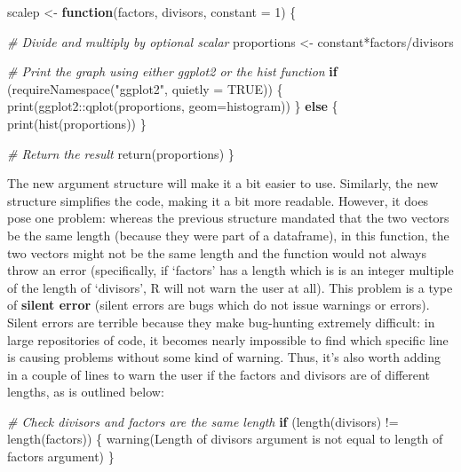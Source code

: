 \documentclass[
]{book}
\newenvironment{Shaded}{\begin{snugshade}}{\end{snugshade}}
\newcommand{\AttributeTok}[1]{\textcolor[rgb]{0.77,0.63,0.00}{#1}}
\newcommand{\CommentTok}[1]{\textcolor[rgb]{0.56,0.35,0.01}{\textit{#1}}}
\newcommand{\ConstantTok}[1]{\textcolor[rgb]{0.00,0.00,0.00}{#1}}
\newcommand{\ControlFlowTok}[1]{\textcolor[rgb]{0.13,0.29,0.53}{\textbf{#1}}}
\newcommand{\DecValTok}[1]{\textcolor[rgb]{0.00,0.00,0.81}{#1}}
\newcommand{\FunctionTok}[1]{\textcolor[rgb]{0.00,0.00,0.00}{#1}}
\newcommand{\NormalTok}[1]{#1}
\newcommand{\OtherTok}[1]{\textcolor[rgb]{0.56,0.35,0.01}{#1}}
\newcommand{\SpecialCharTok}[1]{\textcolor[rgb]{0.00,0.00,0.00}{#1}}
\newcommand{\StringTok}[1]{\textcolor[rgb]{0.31,0.60,0.02}{#1}}
\begin{document}
\begin{Shaded}
\begin{Highlighting}[]
\NormalTok{scalep }\OtherTok{\textless{}{-}} \ControlFlowTok{function}\NormalTok{(factors, divisors, }\AttributeTok{constant =} \DecValTok{1}\NormalTok{) \{}

  \CommentTok{\# Divide and multiply by optional scalar}
\NormalTok{  proportions }\OtherTok{\textless{}{-}}\NormalTok{ constant}\SpecialCharTok{*}\NormalTok{factors}\SpecialCharTok{/}\NormalTok{divisors}

  \CommentTok{\# Print the graph using either ggplot2 or the hist function}
  \ControlFlowTok{if}\NormalTok{ (}\FunctionTok{requireNamespace}\NormalTok{(}\StringTok{"ggplot2"}\NormalTok{, }\AttributeTok{quietly =} \ConstantTok{TRUE}\NormalTok{)) \{}
    \FunctionTok{print}\NormalTok{(ggplot2}\SpecialCharTok{::}\FunctionTok{qplot}\NormalTok{(proportions, }\AttributeTok{geom=}\StringTok{\textquotesingle{}histogram\textquotesingle{}}\NormalTok{))}
\NormalTok{  \} }\ControlFlowTok{else}\NormalTok{ \{}
    \FunctionTok{print}\NormalTok{(}\FunctionTok{hist}\NormalTok{(proportions))}
\NormalTok{  \}}

  \CommentTok{\# Return the result}
  \FunctionTok{return}\NormalTok{(proportions)}
\NormalTok{\}}
\end{Highlighting}
\end{Shaded}

The new argument structure will make it a bit easier to use. Similarly, the new structure simplifies the code, making it a bit more readable. However, it does pose one problem: whereas the previous structure mandated that the two vectors be the same length (because they were part of a dataframe), in this function, the two vectors might not be the same length and the function would not always throw an error (specifically, if `factors' has a length which is is an integer multiple of the length of `divisors', R will not warn the user at all). This problem is a type of \textbf{silent error} (silent errors are bugs which do not issue warnings or errors). Silent errors are terrible because they make bug-hunting extremely difficult: in large repositories of code, it becomes nearly impossible to find which specific line is causing problems without some kind of warning. Thus, it's also worth adding in a couple of lines to warn the user if the factors and divisors are of different lengths, as is outlined below:

\begin{Shaded}
\begin{Highlighting}[]
  \CommentTok{\# Check divisors and factors are the same length}
  \ControlFlowTok{if}\NormalTok{ (}\FunctionTok{length}\NormalTok{(divisors) }\SpecialCharTok{!=} \FunctionTok{length}\NormalTok{(factors)) \{}
    \FunctionTok{warning}\NormalTok{(}\StringTok{\textquotesingle{}Length of divisors argument is not equal to length of factors argument\textquotesingle{}}\NormalTok{)}
\NormalTok{  \}}
\end{Highlighting}
\end{Shaded}
\end{document}
